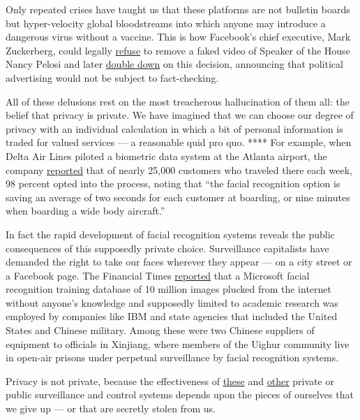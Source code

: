 Only repeated crises have taught us that these platforms are not
bulletin boards but hyper-velocity global bloodstreams into which anyone
may introduce a dangerous virus without a vaccine. This is how
Facebook's chief executive, Mark Zuckerberg, could legally
\href{https://www.washingtonpost.com/technology/2019/05/24/facebook-acknowledges-pelosi-video-is-faked-declines-delete-it/}{refuse}
to remove a faked video of Speaker of the House Nancy Pelosi and later
\href{https://apnews.com/90e5e81f501346f8779cb2f8b8880d9c}{double down}
on this decision, announcing that political advertising would not be
subject to fact-checking.

All of these delusions rest on the most treacherous hallucination of
them all: the belief that privacy is private. We have imagined that we
can choose our degree of privacy with an individual calculation in which
a bit of personal information is traded for valued services --- a
reasonable quid pro quo. **** For example, when Delta Air Lines piloted
a biometric data system at the Atlanta airport, the company
\href{https://www.usatoday.com/story/travel/flights/todayinthesky/2018/11/29/delta-usas-first-biometric-terminal-ready-go-atlanta-airport/2145655002/}{reported}
that of nearly 25,000 customers who traveled there each week, 98 percent
opted into the process, noting that ``the facial recognition option is
saving an average of two seconds for each customer at boarding, or nine
minutes when boarding a wide body aircraft.''

In fact the rapid development of facial recognition systems reveals the
public consequences of this supposedly private choice. Surveillance
capitalists have demanded the right to take our faces wherever they
appear --- on a city street or a Facebook page. The Financial Times
\href{https://www.ft.com/content/7d3e0d6a-87a0-11e9-a028-86cea8523dc2}{reported}
that a Microsoft facial recognition training database of 10 million
images plucked from the internet without anyone's knowledge and
supposedly limited to academic research was employed by companies like
IBM and state agencies that included the United States and Chinese
military. Among these were two Chinese suppliers of equipment to
officials in Xinjiang, where members of the Uighur community live in
open-air prisons under perpetual surveillance by facial recognition
systems.

Privacy is not private, because the effectiveness of
\href{https://www.ft.com/content/cf19b956-60a2-11e9-b285-3acd5d43599e}{these}
and
\href{https://carnegieendowment.org/2019/09/17/global-expansion-of-ai-surveillance-pub-79847}{other}
private or public surveillance and control systems depends upon the
pieces of ourselves that we give up --- or that are secretly stolen from
us.

